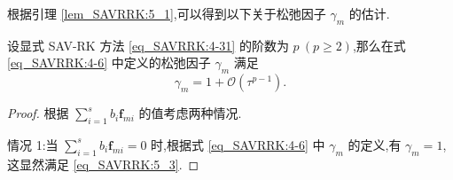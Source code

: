 根据引理 \ref{lem_SAVRRK:5_1},可以得到以下关于松弛因子 $\gamma_m$ 的估计.

\begin{theorem}\label{thm_SAVRRK:5_1}
设显式 SAV-RK 方法 \eqref{eq_SAVRRK:4-31} 的阶数为 $p~(p \geq 2)$,那么在式 \eqref{eq_SAVRRK:4-6} 中定义的松弛因子 $\gamma_m$ 满足
\begin{equation}\label{eq_SAVRRK:5_3}
\gamma_m=1+\mathcal{O}(\tau^{p-1}).
\end{equation}
\end{theorem}	

\begin{proof}
根据 $\sum\limits_{i=1}^s b_i \bm{f}_{m i}$ 的值考虑两种情况.

情况 1:当 $\sum\limits_{i=1}^s b_i \bm{f}_{m i} = 0$ 时,根据式 \eqref{eq_SAVRRK:4-6} 中 $\gamma_m$ 的定义,有 $\gamma_m = 1$,这显然满足 \eqref{eq_SAVRRK:5_3}.


\end{proof}
